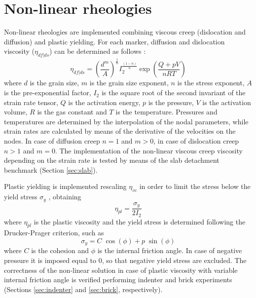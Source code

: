 \documentclass[hidelinks,10pt,a4paper]{article}
\begin{document}
\section{Non-linear rheologies}\label{sec:nonlinear}
Non-linear rheologies are implemented combining viscous creep (dislocation and diffusion) and plastic yielding. For each marker, diffusion and dislocation
viscosity ($\eta_{df|ds}$) can be determined as follows \citep{Karato1993,Wang2016,Glerum2018}:
\begin{equation}\label{eq:viscous}
\eta_{df|ds}=\left(\frac{d^m}{A}\right)^{\frac{1}{n}}I_2^{\frac{(1-n)}{n}}\exp\left(\frac{Q+pV}{nRT}\right)
\end{equation}
where $d$ is the grain size, $m$ is the grain size exponent, $n$ is the stress exponent, $A$ is the pre-exponential factor, $I_2$ is the square root of the
second invariant of the strain rate tensor, $Q$ is the activation energy, $p$ is the pressure, $V$ is the activation volume, $R$ is the gas constant and $T$
is the temperature. Pressures and temperatures are determined by the interpolation of the nodal parameters, while strain rates are calculated by means of the
derivative of the velocities on the nodes. In case of diffusion creep $n=1$ and $m>0$, in case of dislocation creep $n>1$ and $m=0$. The implementation of the
non-linear viscous creep viscosity depending on the strain rate is tested by means of the slab detachment benchmark (Section \ref{sec:slab}).

Plastic yielding is implemented rescaling $\eta_{vc}$ in order to limit the stress below the yield stress $\sigma_y$ \citep{Thieulot2008,Thieulot2014,Glerum2018},
obtaining
\begin{equation}\label{eq:plastic}
\eta_{pl}=\frac{\sigma_y}{2I_2}
\end{equation}
where $\eta_{pl}$ is the plastic viscosity and the yield stress is determined following the Drucker-Prager criterion, such as
\begin{equation}\label{eq:yield}
\sigma_y=C\;\cos(\phi)+p\;\sin(\phi)
\end{equation}
where $C$ is the cohesion and $\phi$ is the internal friction angle. In case of negative pressure it is imposed equal to 0, so that negative yield stress are
excluded. The correctness of the non-linear solution in case of plastic viscosity with variable internal friction angle is verified performing indenter and
brick experiments (Sections \ref{sec:indenter} and \ref{sec:brick}, respectively).
\end{document}
